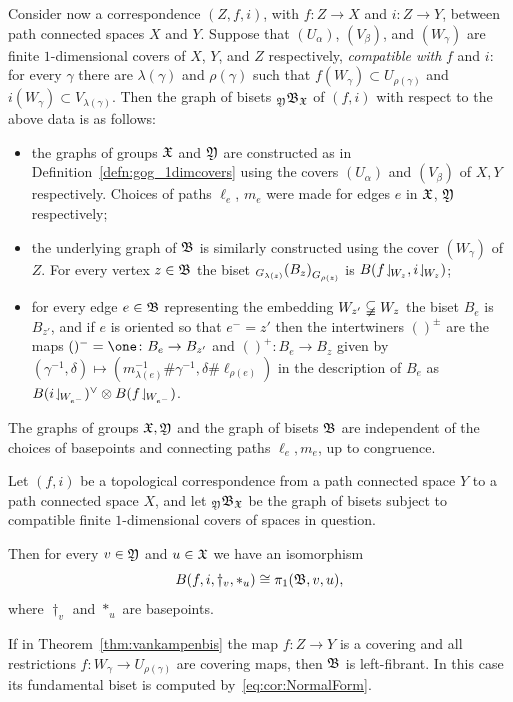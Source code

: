 \documentclass{amsart}
\begin{document}
Consider now a correspondence $(Z,f,i)$, with $f\colon Z\to X$ and
$i\colon Z\to Y$, between path connected spaces $X$ and $Y$.  Suppose
that $(U_{\alpha})$, $(V_\beta)$, and $(W_\gamma)$ are finite
$1$-dimensional covers of $X$, $Y$, and $Z$ respectively,
\emph{compatible with} $f$ and $i$: for every $\gamma$ there are
$\lambda(\gamma)$ and $\rho(\gamma)$ such that
$f(W_\gamma)\subset U_{\rho(\gamma)}$ and
$i(W_\gamma)\subset V_{\lambda(\gamma)}$.  Then the graph of
bisets $\subscript \gfY\gfB_\gf$ of $(f,i)$ with respect to
the above data is as follows:
\begin{itemize}
\item the graphs of groups ${\mathfrak X}$ and ${\mathfrak Y}$ are constructed as
  in Definition~\ref{defn:gog_1dimcovers} using the covers
  $(U_\alpha)$ and $(V_\beta)$ of $X,Y$ respectively. Choices of paths
  $\ell_e$, $m_e$ were made for edges $e$ in ${\mathfrak X}$, ${\mathfrak Y}$
  respectively;
\item the underlying graph of ${\mathfrak B}$ is similarly constructed
  using the cover $(W_\gamma)$ of $Z$. For every vertex
  $z\in {\mathfrak B}$ the biset
  $\subscript{G_{\lambda(z)}}{(B_z)}_{G_{\rho(z)}}$ is
  $B(f\!\downharpoonleft_{\!W_z}, i\!\downharpoonleft_{\!W_z})$;
\item for every edge $e\in {\mathfrak B}$ representing the embedding
  $W_{z'}\varsubsetneqq W_z$ the biset $B_e$ is $B_{z'}$, and if $e$
  is oriented so that $e^-=z'$ then the intertwiners $()^\pm$ are the
  maps $()^-=\one\colon B_e\to B_{z'}$ and $()^+\colon B_e\to B_z$
  given by
  $(\gamma^{-1},\delta)\mapsto(m_{\lambda(e)}^{-1}\#\gamma^{-1},\delta\#\ell_{\rho(e)})$
  in the description of $B_e$ as
  $B(i\!\downharpoonleft_{\!W_{e^-}})^\vee\otimes B(f\!\downharpoonleft_{\!W_{e^-}})$.
\end{itemize}
The graphs of groups ${\mathfrak X},{\mathfrak Y}$ and the graph of bisets
${\mathfrak B}$ are independent of the choices of basepoints and
connecting paths $\ell_e,m_e$, up to congruence.

\begin{thm}\label{thm:vankampenbis}
  Let $(f,i)$ be a topological correspondence from a path connected
  space $Y$ to a path connected space $X$, and let
  $\subscript\gfY\gfB_\gf$ be the graph of bisets subject to
  compatible finite $1$-dimensional covers of spaces in question.
  
  Then for every $v\in{\mathfrak Y}$ and $u\in{\mathfrak X}$ we have an
  isomorphism
  \[B(f,i,\dagger_v,*_u)\cong \pi_1({\mathfrak B}, v,u),\]
  where $\dagger_v$ and $*_u$ are basepoints. 
\end{thm}
If in Theorem~\ref{thm:vankampenbis} the map $f\colon Z\to Y$ is a
covering and all restrictions $f\colon W_\gamma\to U_{\rho(\gamma)}$
are covering maps, then ${\mathfrak B}$ is left-fibrant. In this case
its fundamental biset is computed by~\eqref{eq:cor:NormalForm}.
\end{document}
